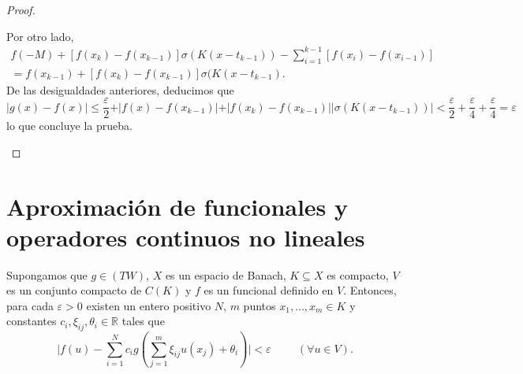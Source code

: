 \begin{proof}
\begin{itemize}
Por otro lado, 
\begin{gather}
f(-M) + [f(x_{k})-f(x_{k-1})]\sigma(K(x-t_{k-1})) -  \sum_{i=1}^{k-1} [ f(x_{i})-f(x_{i-1})] \\ =
 f(x_{k-1}) + [f(x_{k})-f(x_{k-1})]\sigma(K(x-t_{k-1}).
\end{gather}
De las desigualdades anteriores, deducimos que
\begin{equation}
\vert g(x) - f(x) \vert \leq \frac{\varepsilon}{2} + \vert f(x) - f(x_{k-1}) \vert + \vert f(x_{k})-f(x_{k-1})\vert \vert \sigma(K(x-t_{k-1}))\vert < \frac{\varepsilon}{2}+\frac{\varepsilon}{4}+\frac{\varepsilon}{4} = \varepsilon
\end{equation}
lo que concluye la prueba.
\end{itemize}
\end{proof}


 
\section{Aproximación de funcionales y operadores continuos no lineales}
\begin{teorema}\label{thm:p04}
Supongamos que \(g\in(TW)\), $X$ es un espacio de Banach, $K$\(\subseteq X\) es compacto, $V$ es un conjunto compacto de \(C(K)\) y \(f\) es un funcional definido en $V$. 
Entonces, para cada \(\varepsilon > 0 \) existen un entero positivo $N$, $m$ puntos \(x_{1},\ldots,x_{m} \in K\) y constantes $c_{i}, \xi_{ij}, \theta_{i}\in\mathds{R}$ tales que 
\[ \vert f(u) - \sum_{i=1}^{N} c_{i} g(\sum_{j=1}^{m}\xi_{ij}u(x_{j}) + \theta_{i}) \vert < \varepsilon \hspace{1cm} (\forall u \in V).\]
\end{teorema}


